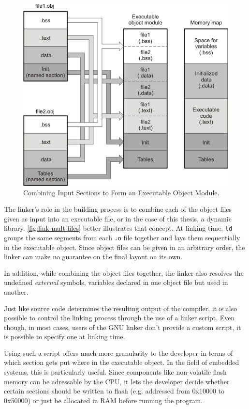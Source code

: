 {\begin{figure}[htbp]
	\centering 
	\includegraphics[width=.75\linewidth,keepaspectratio]{art/obj-to-elf-to-mem.png}
	\caption{Combining Input Sections to Form an Executable Object Module.\cite{online:linking}}
	\label{fig:link-mult-files}
\end{figure}

The linker's role in the building process is to combine each of the object files given as input into an executable file, or in the case of this thesis, a dynamic library. \autoref{fig:link-mult-files} better illustrates that concept. At linking time, \texttt{ld} groups the same segments from each \texttt{.o} file together and lays them sequentially in the executable object. Since object files can be given in an arbitrary order, the linker can make no guarantee on the final layout on its own.

In addition, while combining the object files together, the linker also resolves the undefined \textit{external} symbols, variables declared in one object file but used in another. 

Just like source code determines the resulting output of the compiler, it is also possible to control the linking process through the use of a linker script\cite{online:ld-scripts}. Even though, in most cases, users of the GNU linker don't provide a custom script, it is possible to specify one at linking time. 

Using such a script offers much more granularity to the developer in terms of which section gets put where in the executable object. In the field of embedded systems, this is particularly useful. Since components like non-volatile flash memory can be adressable by the CPU\cite{online:flash-ram}, it lets the developer decide whether certain sections should be written to flash (e.g. addressed from 0x10000 to 0x50000) or just be allocated in RAM before running the program.

}
